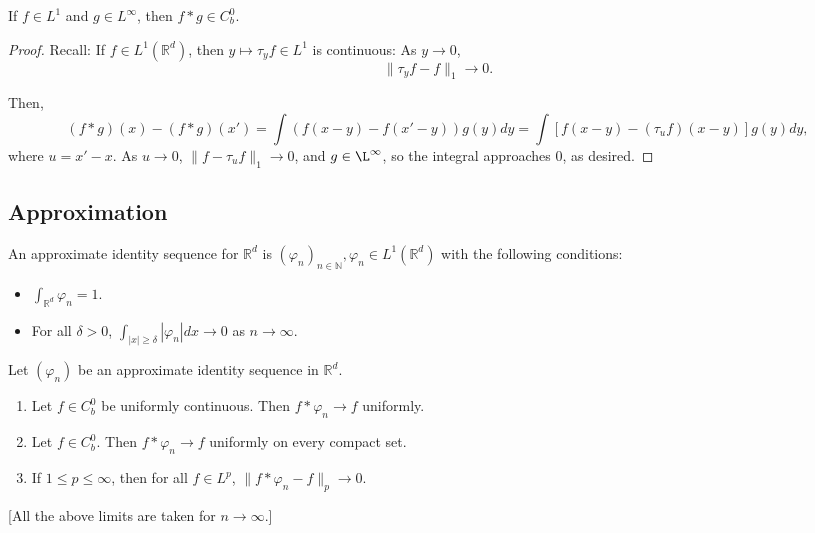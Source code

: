 \documentclass[11pt]{scrartcl}
\newcommand{\N}{\mathbb{N}}
\newcommand{\R}{\mathbb{R}}
\let \phi \varphi
\newcommand{\<}{\langle}
\renewcommand{\>}{\rangle}
\begin{document}
\begin{proposition} If $f \in L^1$ and $g \in L^{\infty}$, then $f * g \in C_b^0$.  
\end{proposition}
\begin{proof}
Recall:  If $f \in L^1(\R^d)$, then $y \mapsto \tau_y f \in L^1$ is continuous: As $y\rightarrow 0$, 
$$\|\tau_y f - f\|_1 \rightarrow 0.$$

Then,
$$(f*g)(x) - (f*g)(x') = \int (f(x-y) - f(x' - y))g(y)dy = \int[ f(x-y) - (\tau_u f)(x-y) ]g(y)dy,$$
where $u = x'-x$.  As $u \rightarrow 0$, $\|f - \tau_u f\|_1 \rightarrow 0$, and $g \in \L^\infty$, so the integral approaches $0$, as desired.
\end{proof}
\subsection{Approximation}
\begin{definition} An approximate identity sequence for $\R^d$ is $(\phi_n)_{n \in \N}, \phi_n \in L^1(\R^d)$ with the following conditions:
\begin{itemize}
\item $\int_{\R^d}\phi_n = 1$.
\item For all $\delta > 0$, $\int_{|x| \ge \delta}|\phi_n|dx \rightarrow 0$ as $n \rightarrow \infty$.
\end{itemize}
\end{definition}
\begin{thm} Let $(\phi_n)$ be an approximate identity sequence in $\R^d$.  \begin{enumerate}
\item Let $f \in C_b^0$ be uniformly continuous.  Then $f * \phi_n \rightarrow f$ uniformly.
\item Let $f \in C_b^0$.  Then $f * \phi_n \rightarrow f$ uniformly on every compact set.
\item If $1 \le p \le \infty$, then for all $f \in L^p$, $\|f * \phi_n - f\|_p \rightarrow 0$.
\end{enumerate}
[All the above limits are taken for $n \rightarrow \infty$.]
\end{thm}
\end{document}
